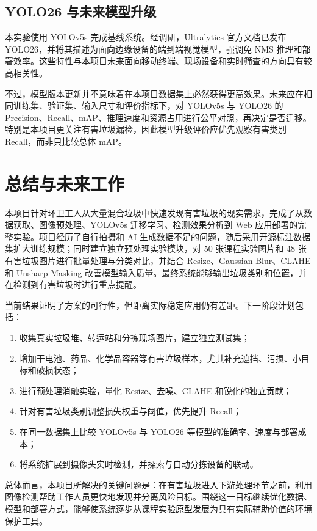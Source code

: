 \documentclass[UTF8,a4paper,12pt]{ctexart}
\begin{document}
\subsection{YOLO26 与未来模型升级}

本实验使用 YOLOv5s 完成基线系统。经调研，Ultralytics 官方文档已发布 YOLO26，并将其描述为面向边缘设备的端到端视觉模型，强调免 NMS 推理和部署效率\cite{yolo26docs}。这些特性与本项目未来面向移动终端、现场设备和实时筛查的方向具有较高相关性。

不过，模型版本更新并不意味着在本项目数据集上必然获得更高效果。未来应在相同训练集、验证集、输入尺寸和评价指标下，对 YOLOv5s 与 YOLO26 的 Precision、Recall、mAP、推理速度和资源占用进行公平对照，再决定是否迁移。特别是本项目更关注有害垃圾漏检，因此模型升级评价应优先观察有害类别 Recall，而非只比较总体 mAP。

\section{总结与未来工作}

本项目针对环卫工人从大量混合垃圾中快速发现有害垃圾的现实需求，完成了从数据获取、图像预处理、YOLOv5s 迁移学习、检测效果分析到 Web 应用部署的完整实验。项目经历了自行拍摄和 AI 生成数据不足的问题，随后采用开源标注数据集扩大训练规模；同时建立独立预处理实验模块，对 50 张课程实验图片和 48 张有害垃圾图片进行批量处理与分类对比，并结合 Resize、Gaussian Blur、CLAHE 和 Unsharp Masking 改善模型输入质量。最终系统能够输出垃圾类别和位置，并在检测到有害垃圾时进行重点提醒。

当前结果证明了方案的可行性，但距离实际稳定应用仍有差距。下一阶段计划包括：

\begin{enumerate}
  \item 收集真实垃圾堆、转运站和分拣现场图片，建立独立测试集；
  \item 增加干电池、药品、化学品容器等有害垃圾样本，尤其补充遮挡、污损、小目标和破损状态；
  \item 进行预处理消融实验，量化 Resize、去噪、CLAHE 和锐化的独立贡献；
  \item 针对有害垃圾类别调整损失权重与阈值，优先提升 Recall；
  \item 在同一数据集上比较 YOLOv5s 与 YOLO26 等模型的准确率、速度与部署成本；
  \item 将系统扩展到摄像头实时检测，并探索与自动分拣设备的联动。
\end{enumerate}

总体而言，本项目所解决的关键问题是：在有害垃圾进入下游处理环节之前，利用图像检测帮助工作人员更快地发现并分离风险目标。围绕这一目标继续优化数据、模型和部署方式，能够使系统逐步从课程实验原型发展为具有实际辅助价值的环境保护工具。
\end{document}
